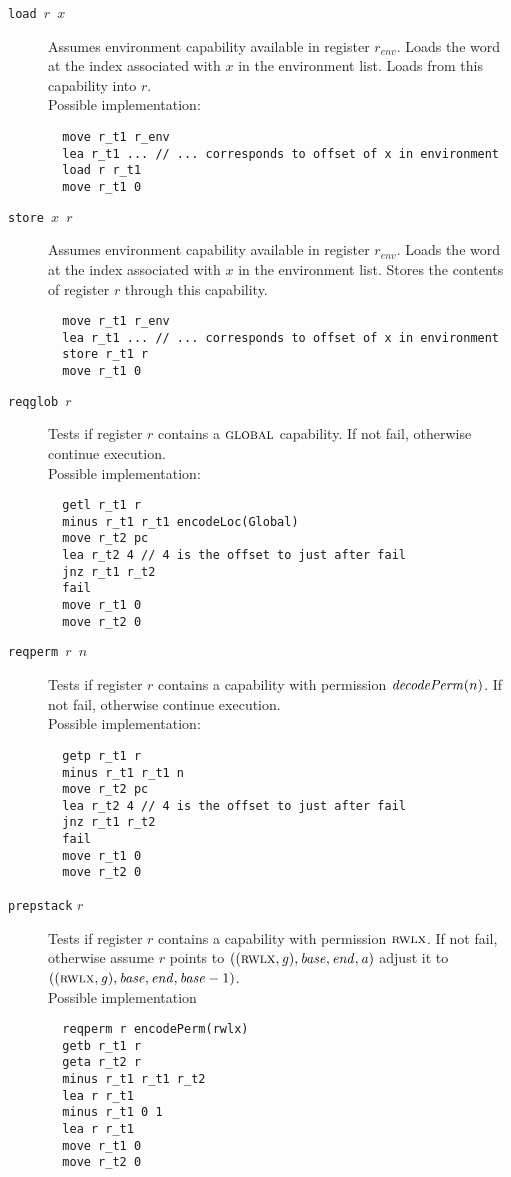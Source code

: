 \documentclass[a4paper]{article}
\newcommand\lau[1]{{\color{purple} \sf \footnotesize {LS: #1}}\\}
\renewcommand\lau[1]{}
\newcommand{\var}[1]{\mathit{#1}}
\newcommand{\gl}{\var{g}}
\newcommand{\addr}{\var{a}}
\newcommand{\start}{\var{base}}
\newcommand{\addrend}{\var{end}}
\newcommand{\plainfun}[2]{
  \ifthenelse{\equal{#2}{}}
  {\mathit{#1}}
  {\mathit{#1}(#2)}
}
\newcommand{\decodePerm}[1]{\plainfun{decodePerm}{#1}}
\newcommand{\plainperm}[1]{\textsc{#1}}
\newcommand{\rwlx}{\plainperm{rwlx}}
\newcommand{\glob}{\plainperm{global}}
\begin{document}
\begin{description}
\item[\texttt{load $r$ $x$}] Assumes environment capability available in register $r_{\var{env}}$. Loads the word at the index associated with $x$ in the environment list. Loads from this capability into $r$.\\
Possible implementation:
\begin{lstlisting}
  move r_t1 r_env
  lea r_t1 ... // ... corresponds to offset of x in environment
  load r r_t1
  move r_t1 0
\end{lstlisting}
\item[\texttt{store $x$ $r$}] Assumes environment capability available in register $r_{\var{env}}$. Loads the word at the index associated with $x$ in the environment list. Stores the contents of register $r$ through this capability.
\begin{lstlisting}
  move r_t1 r_env
  lea r_t1 ... // ... corresponds to offset of x in environment
  store r_t1 r
  move r_t1 0
\end{lstlisting}
\item[\texttt{reqglob $r$}] Tests if register $r$ contains a $\glob$ capability. If not fail, otherwise continue execution.\\
Possible implementation:
\begin{lstlisting}
  getl r_t1 r
  minus r_t1 r_t1 encodeLoc(Global)
  move r_t2 pc
  lea r_t2 4 // 4 is the offset to just after fail
  jnz r_t1 r_t2
  fail
  move r_t1 0
  move r_t2 0
\end{lstlisting}
\item[\texttt{reqperm $r$ $n$}] Tests if register $r$ contains a capability with permission $\decodePerm{n}$. If not fail, otherwise continue execution.\\
Possible implementation:
\begin{lstlisting}
  getp r_t1 r
  minus r_t1 r_t1 n
  move r_t2 pc
  lea r_t2 4 // 4 is the offset to just after fail
  jnz r_t1 r_t2
  fail
  move r_t1 0
  move r_t2 0
\end{lstlisting}

\item[\texttt{prepstack} $r$] Tests if register $r$ contains a capability with permission $\rwlx$. If not fail, otherwise assume $r$ points to $((\rwlx,\gl),\start,\addrend,\addr)$ adjust it to $((\rwlx,\gl),\start,\addrend,\start - 1)$.\\
Possible implementation
\begin{lstlisting}
  reqperm r encodePerm(rwlx)
  getb r_t1 r
  geta r_t2 r
  minus r_t1 r_t1 r_t2
  lea r r_t1
  minus r_t1 0 1
  lea r r_t1
  move r_t1 0
  move r_t2 0
\end{lstlisting}
  \lau{What if the stack starts at address 0? Changing the stack convention to always point at the first free cell will get rid of this problem (because our memory us uncapped.)}\lau{Seeing as we did not change this: It does not give a problem as such because this would cause the machine to fail which is considered acceptable. It would also be possible to make a more ``sofisticated'' implementation that special cases on this and simply throws the first address away.}
\end{description}
\end{document}
